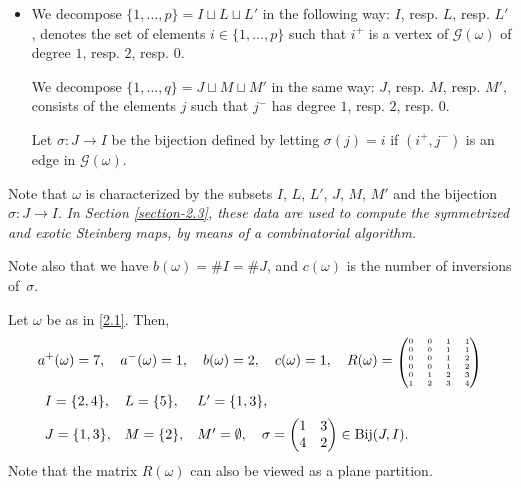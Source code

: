 \documentclass[ALCO,Unicode]{cedram}
\newcommand{\card}[1]{\# #1}
\begin{document}
\begin{itemize}
\item We decompose $\{1,\ldots,p\}=I\sqcup L\sqcup L'$ in the following way:
$I$, resp. $L$, resp. $L'$, denotes the set of elements $i\in\{1,\ldots,p\}$ such that $i^+$ is a vertex of $\mathcal{G}(\omega)$ of degree $1$, resp. $2$, resp. $0$.

We decompose $\{1,\ldots,q\}=J\sqcup M\sqcup M'$ in the same way: $J$, resp. $M$, resp. $M'$, consists of the elements $j$ such that $j^-$ has degree $1$, resp. $2$, resp. $0$.

Let $\sigma:J\to I$ be the bijection defined by letting $\sigma(j)=i$ if $(i^+,j^-)$ is an edge in $\mathcal{G}(\omega)$.
\end{itemize}
Note that $\omega$ is characterized by the subsets $I$, $L$, $L'$, $J$, $M$, $M'$ and the bijection $\sigma:J\to I$.
{\em In Section \ref{section-2.3},
these data are used to compute
the symmetrized and exotic Steinberg maps, by means of a combinatorial algorithm.}

Note also that we have $b(\omega)=\card{I}=\card{J}$, and $c(\omega)$ is the number of inversions of~$\sigma$.



\begin{exam}
\label{E2.1}
Let $\omega$ be as in \eqref{2.1}. Then,
\begin{eqnarray*}
 & a^+(\omega)=7,\quad a^-(\omega)=1,\quad b(\omega)=2,\quad c(\omega)=1, \quad
R(\omega)=\mbox{\tiny $\begin{pmatrix} 0 & 0 & 1 & 1\\ 0 & 0 & 1 & 1\\ 0 & 0 & 1 & 2\\ 0 & 0 & 1 & 2\\ 0 & 1 & 2 & 3\\ 1 & 2 & 3 & 4 \end{pmatrix}$}\\
&
\begin{array}{llll}
I=\{2,4\}, & L=\{5\}, & L'=\{1,3\},\\[2mm]
J=\{1,3\}, & M=\{2\}, & M'=\emptyset,
\quad\sigma=\begin{pmatrix} 1 & 3\\ 4 & 2 \end{pmatrix}\in\mathrm{Bij}(J,I).
\end{array}
\end{eqnarray*}
Note that the matrix $R(\omega)$ can also be viewed as a plane partition.
\end{exam}
\end{document}
